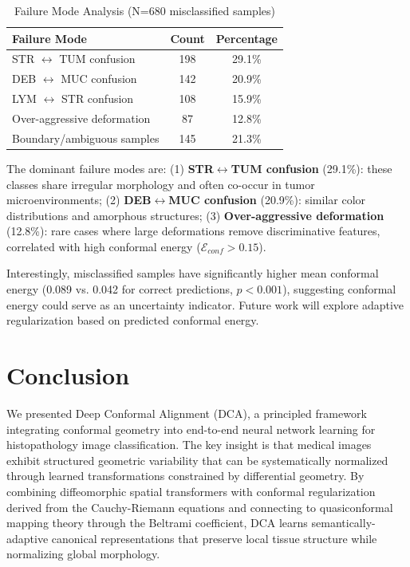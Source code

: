 \documentclass[final,3p,times,review,sort&compress]{elsarticle}
\begin{document}
\begin{table}[t]
\centering
\caption{Failure Mode Analysis (N=680 misclassified samples)}
\label{tab:failure}
\begin{tabularx}{\textwidth}{Xcc}
\hline
\textbf{Failure Mode} & \textbf{Count} & \textbf{Percentage} \\
\hline
STR $\leftrightarrow$ TUM confusion & 198 & 29.1\% \\
DEB $\leftrightarrow$ MUC confusion & 142 & 20.9\% \\
LYM $\leftrightarrow$ STR confusion & 108 & 15.9\% \\
Over-aggressive deformation & 87 & 12.8\% \\
Boundary/ambiguous samples & 145 & 21.3\% \\
\hline
\end{tabularx}
\end{table}

The dominant failure modes are: (1) \textbf{STR$\leftrightarrow$TUM confusion} (29.1\%): these classes share irregular morphology and often co-occur in tumor microenvironments; (2) \textbf{DEB$\leftrightarrow$MUC confusion} (20.9\%): similar color distributions and amorphous structures; (3) \textbf{Over-aggressive deformation} (12.8\%): rare cases where large deformations remove discriminative features, correlated with high conformal energy ($\mathcal{E}_{conf} > 0.15$).

Interestingly, misclassified samples have significantly higher mean conformal energy (0.089 vs. 0.042 for correct predictions, $p < 0.001$), suggesting conformal energy could serve as an uncertainty indicator. Future work will explore adaptive regularization based on predicted conformal energy.

\section{Conclusion}
\label{sec:conclusion}

We presented Deep Conformal Alignment (DCA), a principled framework integrating conformal geometry into end-to-end neural network learning for histopathology image classification. The key insight is that medical images exhibit structured geometric variability that can be systematically normalized through learned transformations constrained by differential geometry. By combining diffeomorphic spatial transformers with conformal regularization derived from the Cauchy-Riemann equations and connecting to quasiconformal mapping theory through the Beltrami coefficient, DCA learns semantically-adaptive canonical representations that preserve local tissue structure while normalizing global morphology.
\end{document}
